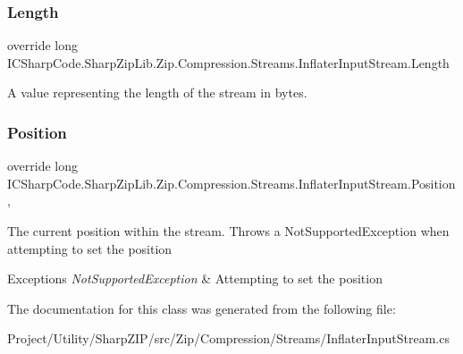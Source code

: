 \subsubsection{\texorpdfstring{Length}{Length}}
{\footnotesize\ttfamily override long I\+C\+Sharp\+Code.\+Sharp\+Zip\+Lib.\+Zip.\+Compression.\+Streams.\+Inflater\+Input\+Stream.\+Length\hspace{0.3cm}{\ttfamily [get]}}



A value representing the length of the stream in bytes. 

\mbox{\label{class_i_c_sharp_code_1_1_sharp_zip_lib_1_1_zip_1_1_compression_1_1_streams_1_1_inflater_input_stream_a2134ebd177f2a8042123281cfc6f472d}} 
\subsubsection{\texorpdfstring{Position}{Position}}
{\footnotesize\ttfamily override long I\+C\+Sharp\+Code.\+Sharp\+Zip\+Lib.\+Zip.\+Compression.\+Streams.\+Inflater\+Input\+Stream.\+Position\hspace{0.3cm}{\ttfamily [get]}, {\ttfamily [set]}}



The current position within the stream. Throws a Not\+Supported\+Exception when attempting to set the position 


\begin{DoxyExceptions}{Exceptions}
{\em Not\+Supported\+Exception} & Attempting to set the position\\
\hline
\end{DoxyExceptions}


The documentation for this class was generated from the following file\+:\begin{DoxyCompactItemize}
\item 
Project/\+Utility/\+Sharp\+Z\+I\+P/src/\+Zip/\+Compression/\+Streams/Inflater\+Input\+Stream.\+cs\end{DoxyCompactItemize}
